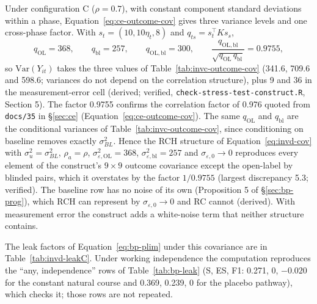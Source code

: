 \documentclass[11pt]{article}
\newcommand{\code}[1]{\texttt{#1}}
\begin{document}
Under configuration C ($\rho = 0.7$), with constant component standard
deviations within a phase, Equation~\eqref{eq:ce-outcome-cov} gives three variance
levels and one cross-phase factor. With $s_t = (10, 10\eta_t, 8)$ and
$q_{ts} = s_t^{\top}Ks_s$,
\begin{equation}
q_{\mathrm{OL}} = 368, \qquad q_{\mathrm{bl}} = 257, \qquad
q_{\mathrm{OL,bl}} = 300, \qquad
\frac{q_{\mathrm{OL,bl}}}{\sqrt{q_{\mathrm{OL}}\, q_{\mathrm{bl}}}} = 0.9755,
\label{eq:invd-q}
\end{equation}
so $\mathrm{Var}(Y_{it})$ takes the three values of
Table~\ref{tab:invc-outcome-cov} (341.6, 709.6 and 598.6; variances do
not depend on the correlation structure), plus 9 and 36 in the
measurement-error cell (derived; verified, \code{check-stress-test-construct.R},
Section 5). The factor 0.9755 confirms the correlation factor of 0.976
quoted from \code{docs/35} in \S\ref{sec:ce}
(Equation~\eqref{eq:ce-outcome-cov}). The same $q_{\mathrm{OL}}$ and
$q_{\mathrm{bl}}$ are the conditional variances of
Table~\ref{tab:invc-outcome-cov}, since conditioning on baseline
removes exactly $\sigma_{BL}^2$. Hence the RCH
structure of Equation~\eqref{eq:invd-cov} with $\sigma_u^2 =
\sigma_{BL}^2$, $\rho_a = \rho$, $\sigma_{\varepsilon,\mathrm{OL}}^2 = 368$,
$\sigma_{\varepsilon,\mathrm{bl}}^2 = 257$ and $\sigma_{\varepsilon,0} \to 0$ reproduces
every element of the construct's $9 \times 9$ outcome covariance except
the open-label by blinded pairs, which it overstates by the factor
$1/0.9755$ (largest discrepancy 5.3; verified). The baseline row has no
noise of its own (Proposition 5 of \S\ref{sec:bp-prog}), which RCH can
represent by $\sigma_{\varepsilon,0} \to 0$ and RC cannot (derived). With
measurement error the construct adds a white-noise term that neither
structure contains.

The leak factors of Equation~\eqref{eq:bp-plim} under this covariance
are in Table~\ref{tab:invd-leakC}. Under working independence the
computation reproduces the ``any, independence'' rows of
Table~\ref{tab:bp-leak} (S, ES, F1: 0.271, 0, $-0.020$ for the
constant natural course and 0.369, 0.239, 0 for the placebo pathway),
which
checks it; those rows are not repeated.
\end{document}

